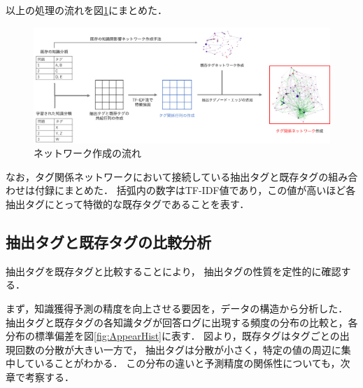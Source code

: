 以上の処理の流れを図\ref{fig:networkflow}にまとめた．

\begin{figure}[htb]
\begin{center}
\includegraphics[width=400pt]{./img/networkflow.png}
\end{center}
\caption{ネットワーク作成の流れ}
\label{fig:networkflow}
\end{figure}


なお，タグ関係ネットワークにおいて接続している抽出タグと既存タグの組み合わせは付録にまとめた．
括弧内の数字はTF-IDF値であり，この値が高いほど各抽出タグにとって特徴的な既存タグであることを表す．




\subsection{抽出タグと既存タグの比較分析}
抽出タグを既存タグと比較することにより，
抽出タグの性質を定性的に確認する．



まず，知識獲得予測の精度を向上させる要因を，データの構造から分析した．
抽出タグと既存タグの各知識タグが回答ログに出現する頻度の分布の比較と，各分布の標準偏差を図\ref{fig:AppearHist}に表す．
図より，既存タグはタグごとの出現回数の分散が大きい一方で，
抽出タグは分散が小さく，特定の値の周辺に集中していることがわかる．
この分布の違いと予測精度の関係性についても，次章で考察する．


